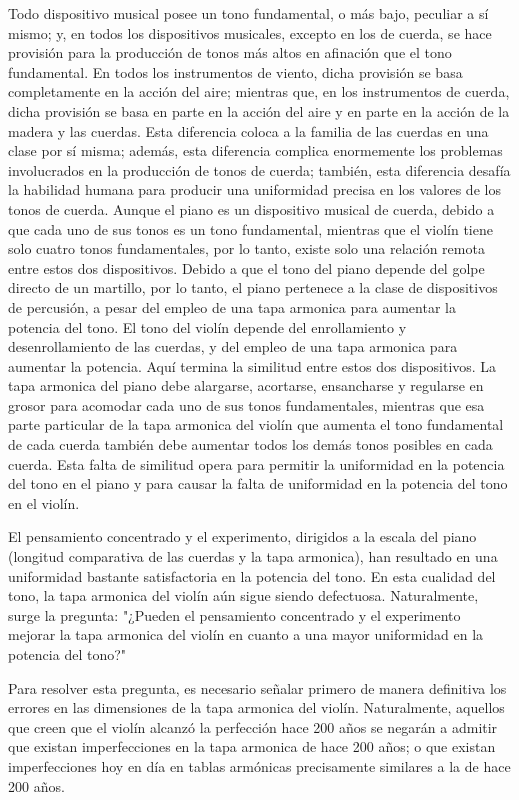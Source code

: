 \documentclass[12pt]{book}
\begin{document}
Todo dispositivo musical posee un tono fundamental, o más bajo, peculiar a sí mismo; y, en todos los dispositivos musicales, excepto en los de cuerda, se hace provisión para la producción de tonos más altos en afinación que el tono fundamental. En todos los instrumentos de viento, dicha provisión se basa completamente en la acción del aire; mientras que, en los instrumentos de cuerda, dicha provisión se basa en parte en la acción del aire y en parte en la acción de la madera y las cuerdas. Esta diferencia coloca a la familia de las cuerdas en una clase por sí misma; además, esta diferencia complica enormemente los problemas involucrados en la producción de tonos de cuerda; también, esta diferencia desafía la habilidad humana para producir una uniformidad precisa en los valores de los tonos de cuerda. Aunque el piano es un dispositivo musical de cuerda, debido a que cada uno de sus tonos es un tono fundamental, mientras que el violín tiene solo cuatro tonos fundamentales, por lo tanto, existe solo una relación remota entre estos dos dispositivos. Debido a que el tono del piano depende del golpe directo de un martillo, por lo tanto, el piano pertenece a la clase de dispositivos de percusión, a pesar del empleo de una tapa armonica para aumentar la potencia del tono. El tono del violín depende del enrollamiento y desenrollamiento de las cuerdas, y del empleo de una tapa armonica para aumentar la potencia. Aquí termina la similitud entre estos dos dispositivos. La tapa armonica del piano debe alargarse, acortarse, ensancharse y regularse en grosor para acomodar cada uno de sus tonos fundamentales, mientras que esa parte particular de la tapa armonica del violín que aumenta el tono fundamental de cada cuerda también debe aumentar todos los demás tonos posibles en cada cuerda. Esta falta de similitud opera para permitir la uniformidad en la potencia del tono en el piano y para causar la falta de uniformidad en la potencia del tono en el violín.

El pensamiento concentrado y el experimento, dirigidos a la escala del piano (longitud comparativa de las cuerdas y la tapa armonica), han resultado en una uniformidad bastante satisfactoria en la potencia del tono. En esta cualidad del tono, la tapa armonica del violín aún sigue siendo defectuosa. Naturalmente, surge la pregunta: "¿Pueden el pensamiento concentrado y el experimento mejorar la tapa armonica del violín en cuanto a una mayor uniformidad en la potencia del tono?"

Para resolver esta pregunta, es necesario señalar primero de manera definitiva los errores en las dimensiones de la tapa armonica del violín. Naturalmente, aquellos que creen que el violín alcanzó la perfección hace 200 años se negarán a admitir que existan imperfecciones en la tapa armonica de hace 200 años; o que existan imperfecciones hoy en día en tablas armónicas precisamente similares a la de hace 200 años.
\end{document}
